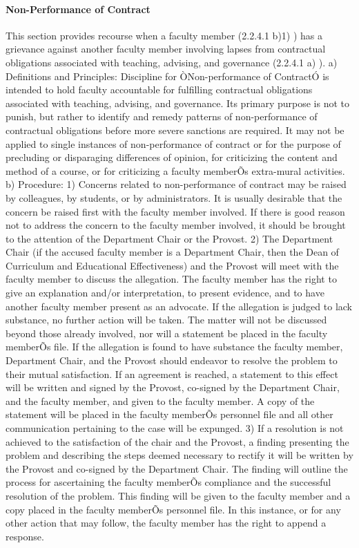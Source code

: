 \documentclass[letterpaper, 11pt]{article}
\begin{document}
			\paragraph{Non-Performance of Contract}
				This section provides recourse when a faculty member (2.2.4.1 b)1) ) has a grievance against another faculty member involving lapses from contractual obligations associated with teaching, advising, and governance (2.2.4.1 a) ).
				a) Definitions and Principles:
				Discipline for ÒNon-performance of ContractÓ is intended to hold faculty accountable for fulfilling contractual obligations associated with teaching, advising, and governance.  Its primary purpose is not to punish, but rather to identify and remedy patterns of non-performance of contractual obligations before more severe sanctions are required.
				It may not be applied to single instances of non-performance of contract or for the purpose of precluding or disparaging differences of opinion, for criticizing the content and method of a course, or for criticizing a faculty memberÕs extra-mural activities.
				b) Procedure:
				1) Concerns related to non-performance of contract may be raised by colleagues, by students, or by administrators.  It is usually desirable that the concern be raised first with the faculty member involved.  If there is good reason not to address the concern to the faculty member involved, it should be brought to the attention of the Department Chair or the Provost.
				2) The Department Chair (if the accused faculty member is a Department Chair, then the Dean of Curriculum and Educational Effectiveness) and the Provost will meet with the faculty member to discuss the allegation.  The faculty member has the right to give an explanation and/or interpretation, to present evidence, and to have another faculty member present as an advocate.  If the allegation is judged to lack substance, no further action will be taken.  The matter will not be discussed beyond those already involved, nor will a statement be placed in the faculty memberÕs file.  If the allegation is found to have substance the faculty member, Department Chair, and the Provost should endeavor to resolve the problem to their mutual satisfaction.  If an agreement is reached, a statement to this effect will be written and signed by the Provost, co-signed by the Department Chair, and the faculty member, and given to the faculty member.  A copy of the statement will be placed in the faculty memberÕs personnel file and all other communication pertaining to the case will be expunged.
				3) If a resolution is not achieved to the satisfaction of the chair and the Provost, a finding presenting the problem and describing the steps deemed necessary to rectify it will be written by the Provost and co-signed by the Department Chair. The finding will outline the process for ascertaining the faculty memberÕs compliance and the successful resolution of the problem.  This finding will be given to the faculty member and a copy placed in the faculty memberÕs personnel file. In this instance, or for any other action that may follow, the faculty member has the right to append a response.
\end{document}
